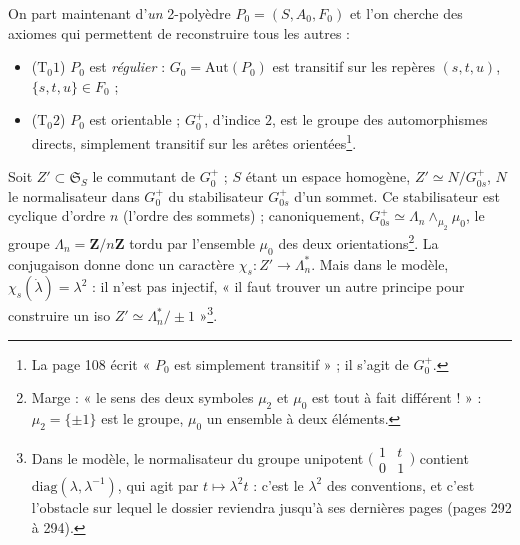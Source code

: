 \documentclass[11pt,a4paper]{article}
\begin{document}
On part maintenant d'\emph{un} 2-polyèdre $P_0 = (S, A_0, F_0)$ et l'on cherche
des axiomes qui permettent de reconstruire tous les autres :
\begin{itemize}
  \item ($\mathrm{T}_0 1$) $P_0$ est \emph{régulier} : $G_0 =
    \mathrm{Aut}(P_0)$ est transitif sur les repères $(s, t, u)$, $\{s, t,
    u\} \in F_0$ ;
  \item ($\mathrm{T}_0 2$) $P_0$ est orientable ; $G_0^{+}$, d'indice $2$, est
    le groupe des automorphismes directs, simplement transitif sur les arêtes
    orientées\footnote{La page 108 écrit « $P_0$ est simplement transitif » ;
    il s'agit de $G_0^{+}$.}.
\end{itemize}
Soit $Z' \subset \mathfrak{S}_S$ le commutant de $G_0^{+}$ ; $S$ étant un espace
homogène, $Z' \simeq N/G^{+}_{0s}$, $N$ le normalisateur dans $G_0^{+}$ du
stabilisateur $G^{+}_{0s}$ d'un sommet. Ce stabilisateur est cyclique d'ordre
$n$ (l'ordre des sommets) ; canoniquement, $G^{+}_{0s} \simeq \Lambda_n
\wedge_{\mu_2} \mu_0$, le groupe $\Lambda_n = \mathbf{Z}/n\mathbf{Z}$ tordu par
l'ensemble $\mu_0$ des deux orientations\footnote{Marge : « le sens des deux
symboles $\mu_2$ et $\mu_0$ est tout à fait différent ! » : $\mu_2 = \{\pm 1\}$
est le groupe, $\mu_0$ un ensemble à deux éléments.}. La conjugaison donne
donc un caractère $\chi_s : Z' \to \Lambda_n^{*}$. Mais dans le modèle, $\chi_s(\dot\lambda)
= \lambda^2$ : il n'est pas injectif, « il faut trouver un autre principe pour
construire un iso $Z' \simeq \Lambda_n^{*}/\pm 1$ »\footnote{Dans le modèle, le
normalisateur du groupe unipotent $\bigl(\begin{smallmatrix} 1 & t \\ 0 & 1
\end{smallmatrix}\bigr)$ contient $\mathrm{diag}(\lambda, \lambda^{-1})$, qui
agit par $t \mapsto \lambda^2 t$ : c'est le $\lambda^2$ des conventions, et
c'est l'obstacle sur lequel le dossier reviendra jusqu'à ses dernières pages
(pages 292 à 294).}.
\end{document}
